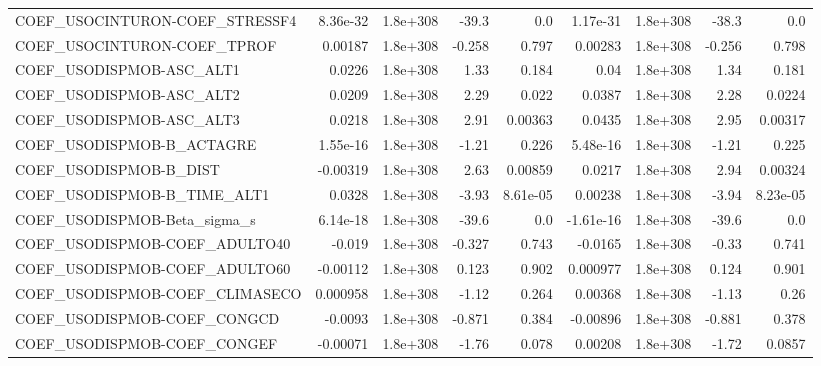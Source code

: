 \begin{tabular}{lrrrrrrrr}
COEF\_USOCINTURON-COEF\_STRESSF4    &    8.36e-32 &     1.8e+308 &     -39.3 &      0.0 &   1.17e-31 &    1.8e+308 &        -38.3 &           0.0 \\
COEF\_USOCINTURON-COEF\_TPROF       &     0.00187 &     1.8e+308 &    -0.258 &    0.797 &    0.00283 &    1.8e+308 &       -0.256 &         0.798 \\
COEF\_USODISPMOB-ASC\_ALT1          &      0.0226 &     1.8e+308 &      1.33 &    0.184 &       0.04 &    1.8e+308 &         1.34 &         0.181 \\
COEF\_USODISPMOB-ASC\_ALT2          &      0.0209 &     1.8e+308 &      2.29 &    0.022 &     0.0387 &    1.8e+308 &         2.28 &        0.0224 \\
COEF\_USODISPMOB-ASC\_ALT3          &      0.0218 &     1.8e+308 &      2.91 &  0.00363 &     0.0435 &    1.8e+308 &         2.95 &       0.00317 \\
COEF\_USODISPMOB-B\_ACTAGRE         &    1.55e-16 &     1.8e+308 &     -1.21 &    0.226 &   5.48e-16 &    1.8e+308 &        -1.21 &         0.225 \\
COEF\_USODISPMOB-B\_DIST            &    -0.00319 &     1.8e+308 &      2.63 &  0.00859 &     0.0217 &    1.8e+308 &         2.94 &       0.00324 \\
COEF\_USODISPMOB-B\_TIME\_ALT1       &      0.0328 &     1.8e+308 &     -3.93 & 8.61e-05 &    0.00238 &    1.8e+308 &        -3.94 &      8.23e-05 \\
COEF\_USODISPMOB-Beta\_sigma\_s      &    6.14e-18 &     1.8e+308 &     -39.6 &      0.0 &  -1.61e-16 &    1.8e+308 &        -39.6 &           0.0 \\
COEF\_USODISPMOB-COEF\_ADULTO40     &      -0.019 &     1.8e+308 &    -0.327 &    0.743 &    -0.0165 &    1.8e+308 &        -0.33 &         0.741 \\
COEF\_USODISPMOB-COEF\_ADULTO60     &    -0.00112 &     1.8e+308 &     0.123 &    0.902 &   0.000977 &    1.8e+308 &        0.124 &         0.901 \\
COEF\_USODISPMOB-COEF\_CLIMASECO    &    0.000958 &     1.8e+308 &     -1.12 &    0.264 &    0.00368 &    1.8e+308 &        -1.13 &          0.26 \\
COEF\_USODISPMOB-COEF\_CONGCD       &     -0.0093 &     1.8e+308 &    -0.871 &    0.384 &   -0.00896 &    1.8e+308 &       -0.881 &         0.378 \\
COEF\_USODISPMOB-COEF\_CONGEF       &    -0.00071 &     1.8e+308 &     -1.76 &    0.078 &    0.00208 &    1.8e+308 &        -1.72 &        0.0857 \\

\end{tabular}
